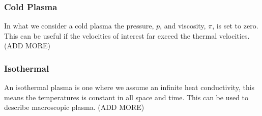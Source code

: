 	\subsubsection{Cold Plasma}
	In what we consider a cold plasma the pressure, \(p\), and viscosity, \(\pi\), is set to zero.
	This can be useful if the velocities of interest far exceed the thermal velocities.
	(ADD MORE)


	\subsubsection{Isothermal}
	An isothermal plasma is one where we assume an infinite heat conductivity,
	this means the temperatures is constant in all space and time. This can be used to
	describe macroscopic plasma.
	(ADD MORE)
